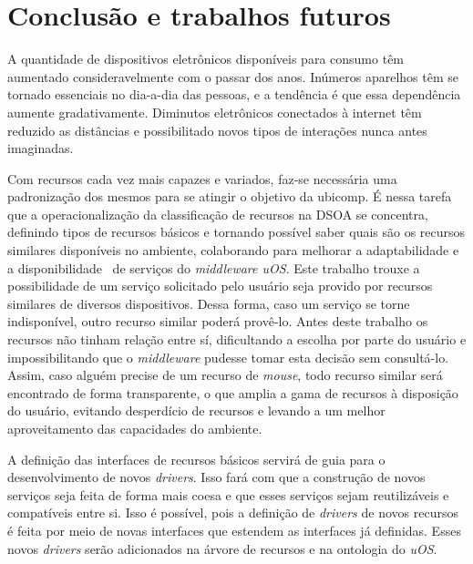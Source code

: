 \chapter{Conclusão e trabalhos futuros}

A quantidade de dispositivos eletrônicos disponíveis para consumo têm aumentado consideravelmente com o passar dos anos. Inúmeros aparelhos têm se tornado essenciais no dia-a-dia das pessoas, e a tendência é que essa dependência aumente gradativamente. Diminutos eletrônicos conectados à internet têm reduzido as distâncias e possibilitado novos tipos de interações nunca antes imaginadas.

\begin{comment}
Atualmente, utilizando um único \emph{smartphone}, é possivel acessar o seu \emph{site} preferido, consultar as ações da bolsa de valores e a previsão do tempo, mudar o canal da sua televisão, ligar a luz do seu quarto, obter rotas urbanas, dentre várias outras tarefas.

É nesse ambiente cada vez mais ubíquo que a classificação de recursos se insere: ambientes com dispositivos heterogêneos (móveis ou não) interagindo entre si, trocando informações ou utilizando capacidades características de cada aparelho.
\end{comment}

Com recursos cada vez mais capazes e variados, faz-se necessária uma padronização dos mesmos para se atingir o objetivo da ubicomp. É nessa tarefa que a operacionalização da classificação de recursos na DSOA se concentra, definindo tipos de recursos básicos e tornando possível saber quais são os recursos similares disponíveis no ambiente, colaborando para melhorar a adaptabilidade e a disponibilidade~\cite{avizienis} de serviços do \emph{middleware uOS}. Este trabalho trouxe a possibilidade de um serviço solicitado pelo usuário seja provido por recursos similares de diversos dispositivos. Dessa forma, caso um serviço se torne indisponível, outro recurso similar poderá provê-lo. Antes deste trabalho os recursos não tinham relação entre sí, dificultando a escolha por parte do usuário e impossibilitando que o \emph{middleware} pudesse tomar esta decisão sem consultá-lo. Assim, caso alguém precise de um recurso de \emph{mouse}, todo recurso similar será encontrado de forma transparente, o que amplia a gama de recursos à disposição do usuário, evitando desperdício de recursos e levando a um melhor aproveitamento das capacidades do ambiente.

A definição das interfaces de recursos básicos servirá de guia para o desenvolvimento de novos \emph{drivers}. Isso fará com que a construção de novos serviços seja feita de forma mais coesa e que esses serviços sejam reutilizáveis e compatíveis entre si. Isso é possível, pois a definição de \emph{drivers} de novos recursos é feita por meio de novas interfaces que estendem as interfaces já definidas. Esses novos \emph{drivers} serão adicionados na árvore de recursos e na ontologia do \emph{uOS}.


